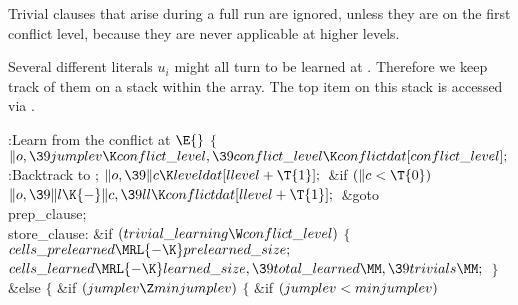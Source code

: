 Trivial clauses that arise during a full run are ignored, unless they
are
on the first conflict level, because they are never applicable
at higher levels.

Several different literals $u_i$ might all turn to be learned at
. Therefore we keep track of them on a stack within the
 array. The top item on this stack is accessed via .

\Y\B\4:Learn from the conflict at \X${}\E{}$\6
${}\{{}$\1\6
${}\|o,\39\\{jumplev}\K\\{conflict\_level},\39\\{conflict\_level}\K%
\\{conflictdat}[\\{conflict\_level}];{}$\6
:Backtrack to \X;\6
${}\|o,\39\|c\K\\{leveldat}[\\{llevel}+\T{1}];{}$\6
\&{if} ${}(\|c<\T{0}){}$\1\5
${}\|o,\39\|l\K{-}\|c,\39\\{ll}\K\\{conflictdat}[\\{llevel}+\T{1}];{}$\2\6
\&{goto} \\{prep\_clause};\6
\4\\{store\_clause}:\5
\6
\&{if} ${}(\\{trivial\_learning}\W\\{conflict\_level}){}$\5
${}\{{}$\1\6
${}\\{cells\_prelearned}\MRL{-{\K}}\\{prelearned\_size};{}$\6
${}\\{cells\_learned}\MRL{-{\K}}\\{learned\_size},\39\\{total\_learned}\MM,\39%
\\{trivials}\MM;{}$\6
\4${}\}{}$\5
\2\&{else}\5
${}\{{}$\1\6
\&{if} ${}(\\{jumplev}\Z\\{minjumplev}){}$\5
${}\{{}$\1\6
\&{if} ${}(\\{jumplev}<\\{minjumplev}){}$\1\5
